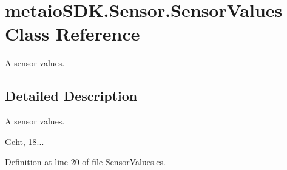 \section{metaio\-S\-D\-K.\-Sensor.\-Sensor\-Values Class Reference}
\label{classmetaio_s_d_k_1_1_sensor_1_1_sensor_values}


A sensor values.  




\subsection{Detailed Description}
A sensor values. 

Geht, 18... 

Definition at line 20 of file Sensor\-Values.\-cs.

